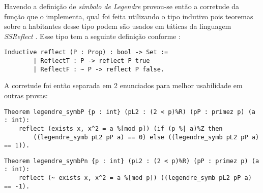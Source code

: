 Havendo a definição de \textit{símbolo de Legendre} provou-se então a corretude da função que o implementa, qual foi feita utilizando o tipo indutivo  pois teoremas sobre a habitantes desse tipo podem são usados em táticas da linguagem \textit{SSReflect} \cite{assia_mahboubi_2022_7118596}. Esse tipo tem a seguinte definição conforme \cite{coq-bool}:
        \begin{lstlisting}[language=coq,frame=single,tabsize=1]
Inductive reflect (P : Prop) : bool -> Set :=
        | ReflectT : P -> reflect P true
        | ReflectF : ~ P -> reflect P false.
        \end{lstlisting}
A corretude foi então separada em 2 enunciados para melhor usabilidade em outras provas:
        \begin{lstlisting}[language=coq,frame=single,tabsize=1, escapechar=@]
Theorem legendre_symbP {p : int} (pL2 : (2 < p)%R) (pP : primez p) (a : int):
    reflect (exists x, x^2 = a %[mod p]) (if (p %| a)%Z then
        ((legendre_symb pL2 pP a) == 0) else ((legendre_symb pL2 pP a) == 1)).
        \end{lstlisting}
        \begin{lstlisting}[language=coq,frame=single,tabsize=1, escapechar=@]
Theorem legendre_symbPn {p : int} (pL2 : (2 < p)%R) (pP : primez p) (a : int):
    reflect (~ exists x, x^2 = a %[mod p]) ((legendre_symb pL2 pP a) == -1).
\end{lstlisting}
        
